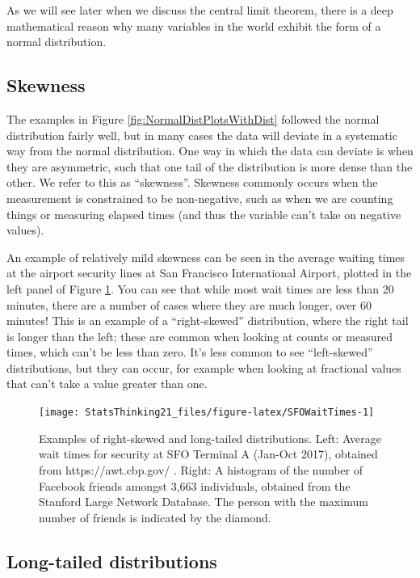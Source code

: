 \documentclass[12pt,]{book}
\theoremstyle{definition}
\theoremstyle{definition}
\theoremstyle{definition}
\theoremstyle{remark}
\begin{document}
As we will see later when we discuss the central limit theorem, there is a deep mathematical reason why many variables in the world exhibit the form of a normal distribution.

\hypertarget{skewness}{%
\subsection{Skewness}\label{skewness}}

The examples in Figure \ref{fig:NormalDistPlotsWithDist} followed the normal distribution fairly well, but in many cases the data will deviate in a systematic way from the normal distribution. One way in which the data can deviate is when they are asymmetric, such that one tail of the distribution is more dense than the other. We refer to this as ``skewness''. Skewness commonly occurs when the measurement is constrained to be non-negative, such as when we are counting things or measuring elapsed times (and thus the variable can't take on negative values).

An example of relatively mild skewness can be seen in the average waiting times at the airport security lines at San Francisco International Airport, plotted in the left panel of Figure \ref{fig:SFOWaitTimes}. You can see that while most wait times are less than 20 minutes, there are a number of cases where they are much longer, over 60 minutes! This is an example of a ``right-skewed'' distribution, where the right tail is longer than the left; these are common when looking at counts or measured times, which can't be less than zero. It's less common to see ``left-skewed'' distributions, but they can occur, for example when looking at fractional values that can't take a value greater than one.

\begin{figure}
\texttt{[image: StatsThinking21\_files/figure-latex/SFOWaitTimes-1]} \caption{Examples of right-skewed and long-tailed distributions.  Left: Average wait times for security at SFO Terminal A (Jan-Oct 2017), obtained from https://awt.cbp.gov/ .  Right: A histogram of the number of Facebook friends amongst 3,663 individuals, obtained from the Stanford Large Network Database. The person with the maximum number of friends is indicated by the diamond.}\label{fig:SFOWaitTimes}
\end{figure}

\hypertarget{long-tailed-distributions}{%
\subsection{Long-tailed distributions}\label{long-tailed-distributions}}
\end{document}
